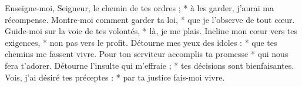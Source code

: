Enseigne-moi, Seigneur, le chemin de tes ordres ; *
à les garder, j’aurai ma récompense.
\versseparator
Montre-moi comment garder ta loi, *
que je l’observe de tout cœur.
\versseparator
Guide-moi sur la voie de tes volontés, *
là, je me plais.
\versseparator
Incline mon cœur vers tes exigences, *
non pas vers le profit.
\versseparator
Détourne mes yeux des idoles : *
que tes chemins me fassent vivre.
\versseparator
Pour ton serviteur accomplis ta promesse *
qui nous fera t’adorer.
\versseparator
Détourne l’insulte qui m’effraie ; *
tes décisions sont bienfaisantes.
\versseparator
Vois, j’ai désiré tes préceptes : *
par ta justice fais-moi vivre.
